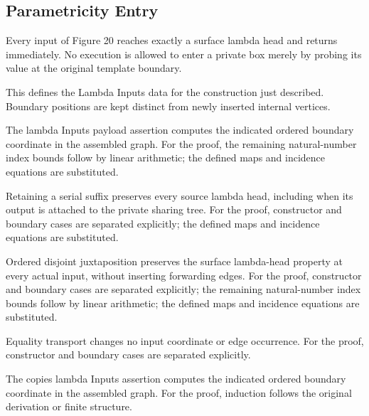 \subsection{Parametricity Entry}
Every input of Figure 20 reaches exactly a surface lambda head and returns immediately. No execution is allowed to enter a private box merely by probing its value at the original template boundary.

This defines the Lambda Inputs data for the construction just described. Boundary positions are kept distinct from newly inserted internal vertices.
\par{}

The lambda Inputs payload assertion computes the indicated ordered boundary coordinate in the assembled graph.
For the proof, the remaining natural-number index bounds follow by linear arithmetic; the defined maps and incidence equations are substituted.
\par{}

Retaining a serial suffix preserves every source lambda head, including when its output is attached to the private sharing tree.
For the proof, constructor and boundary cases are separated explicitly; the defined maps and incidence equations are substituted.
\par{}

Ordered disjoint juxtaposition preserves the surface lambda-head property at every actual input, without inserting forwarding edges.
For the proof, constructor and boundary cases are separated explicitly; the remaining natural-number index bounds follow by linear arithmetic; the defined maps and incidence equations are substituted.
\par{}

Equality transport changes no input coordinate or edge occurrence.
For the proof, constructor and boundary cases are separated explicitly.
\par{}

The copies lambda Inputs assertion computes the indicated ordered boundary coordinate in the assembled graph.
For the proof, induction follows the original derivation or finite structure.
\par{}

